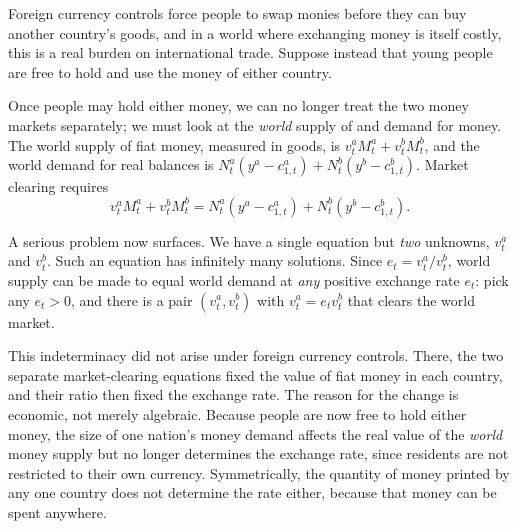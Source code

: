 Foreign currency controls force people to swap monies before they can buy another country's goods, and in a world where exchanging money is itself costly, this is a real burden on international trade. Suppose instead that young people are free to hold and use the money of either country.

Once people may hold either money, we can no longer treat the two money markets separately; we must look at the \emph{world} supply of and demand for money. The world supply of fiat money, measured in goods, is $v_t^a M_t^a + v_t^b M_t^b$, and the world demand for real balances is $N_t^a(y^a - c_{1,t}^a) + N_t^b(y^b - c_{1,t}^b)$. Market clearing requires
\[
v_t^a M_t^a + v_t^b M_t^b = N_t^a\!\left(y^a - c_{1,t}^a\right) + N_t^b\!\left(y^b - c_{1,t}^b\right).
\]

A serious problem now surfaces. We have a single equation but \emph{two} unknowns, $v_t^a$ and $v_t^b$. Such an equation has infinitely many solutions. Since $e_t = v_t^a / v_t^b$, world supply can be made to equal world demand at \emph{any} positive exchange rate $e_t$: pick any $e_t > 0$, and there is a pair $(v_t^a, v_t^b)$ with $v_t^a = e_t v_t^b$ that clears the world market.



This indeterminacy did not arise under foreign currency controls. There, the two separate market-clearing equations fixed the value of fiat money in each country, and their ratio then fixed the exchange rate. The reason for the change is economic, not merely algebraic. Because people are now free to hold either money, the size of one nation's money demand affects the real value of the \emph{world} money supply but no longer determines the exchange rate, since residents are not restricted to their own currency. Symmetrically, the quantity of money printed by any one country does not determine the rate either, because that money can be spent anywhere.

